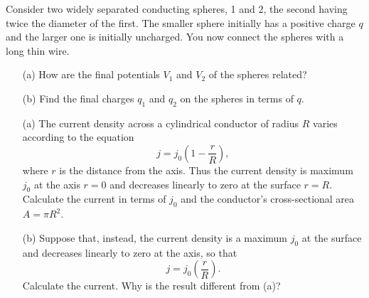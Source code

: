 \documentclass[12pt,letterpaper,boxed,cm]{hmcpset}
\newcommand{\f}[2]{\frac{#1}{#2}}
\newcommand{\pn}[1]{\left( #1 \right)}
\begin{document}

\begin{problem}[28-E42]
	Consider two widely separated conducting spheres, 1 and 2, the second having twice the diameter of the first. The smaller sphere initially has a positive charge $q$ and the larger one is initially uncharged. You now connect the spheres with a long thin wire. 
\begin{enumerate}
	\item[(a)] How are the final potentials $V_1$ and $V_2$ of the spheres related?
	\item[(b)] Find the final charges $q_1$ and $q_2$ on the spheres in terms of $q$.
\end{enumerate}
\end{problem}
\begin{solution}
\end{solution}
\newpage


\begin{problem}[SUP6]
\begin{enumerate}
	\item[(a)] The current density across a cylindrical conductor of radius $R$ varies according to the equation
\[
	j = j_0\pn{1 - \f{r}{R}},
\]
where $r$ is the distance from the axis. Thus the current density is maximum $j_0$ at the axis $r = 0$ and decreases linearly to zero at the surface $r = R$. Calculate the current in terms of $j_0$ and the conductor's cross-sectional area $A = \pi R^2$. 
	\item[(b)] Suppose that, instead, the current density is a maximum $j_0$ at the surface and decreases linearly to zero at the axis, so that
\[
	j = j_0\pn{\f{r}{R}}.
\]
Calculate the current. Why is the result different from (a)?
\end{enumerate}
\end{problem}
\begin{solution}
\end{solution}
\end{document}
